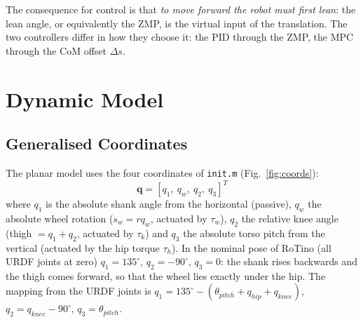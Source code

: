 \documentclass[11pt,a4paper]{article}
\newcommand{\bq}{\bm{q}}
\newcommand{\dgr}{^{\circ}}
\begin{document}
The consequence for control is that \emph{to move forward the robot must first lean}: the
lean angle, or equivalently the ZMP, is the virtual input of the translation.  The two
controllers differ in how they choose it: the PID through the ZMP, the MPC through the CoM
offset $\Delta s$.


\section{Dynamic Model}
\label{sec:model}

\subsection{Generalised Coordinates}

The planar model uses the four coordinates of \texttt{init.m} (Fig.~\ref{fig:coords}):
\begin{equation}
    \bq = [q_1,\ q_w,\ q_2,\ q_3]^T
\end{equation}
where $q_1$ is the absolute shank angle from the horizontal (passive), $q_w$ the absolute
wheel rotation ($s_w = r q_w$, actuated by $\tau_w$), $q_2$ the relative knee angle
(thigh $= q_1+q_2$, actuated by $\tau_k$) and $q_3$ the absolute torso pitch from the vertical
(actuated by the hip torque $\tau_h$).  In the nominal pose of RoTino (all URDF joints at zero)
$q_1 = 135\dgr$, $q_2 = -90\dgr$, $q_3 = 0$: the shank rises backwards and the thigh comes
forward, so that the wheel lies exactly under the hip.  The mapping from the URDF joints is
$q_1 = 135\dgr - (\theta_{pitch} + q_{hip} + q_{knee})$, $q_2 = q_{knee} - 90\dgr$,
$q_3 = \theta_{pitch}$.
\end{document}
